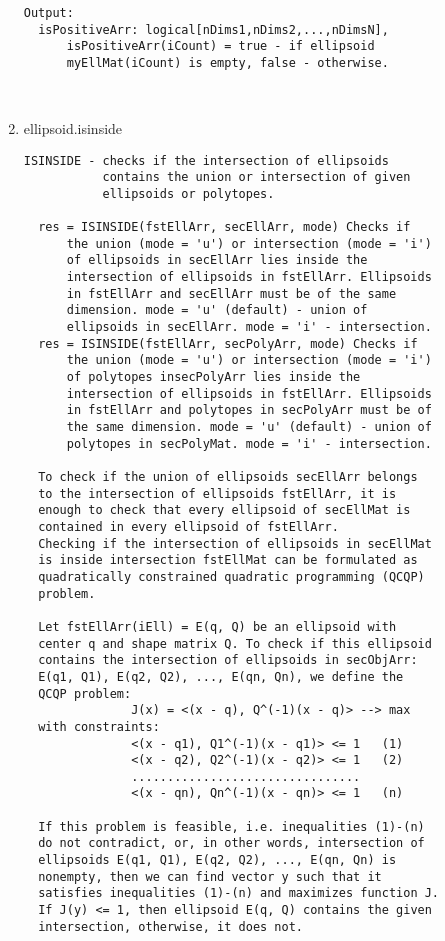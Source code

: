 \begin{enumerate}
\begin{lstlisting}
Output:
  isPositiveArr: logical[nDims1,nDims2,...,nDimsN],
      isPositiveArr(iCount) = true - if ellipsoid
      myEllMat(iCount) is empty, false - otherwise.



\end{lstlisting}
\fontfamily{\familydefault}
\selectfont
\item {ellipsoid.isinside}
\selectfont
\begin{lstlisting}
ISINSIDE - checks if the intersection of ellipsoids
           contains the union or intersection of given
           ellipsoids or polytopes.

  res = ISINSIDE(fstEllArr, secEllArr, mode) Checks if
      the union (mode = 'u') or intersection (mode = 'i')
      of ellipsoids in secEllArr lies inside the
      intersection of ellipsoids in fstEllArr. Ellipsoids
      in fstEllArr and secEllArr must be of the same
      dimension. mode = 'u' (default) - union of
      ellipsoids in secEllArr. mode = 'i' - intersection.
  res = ISINSIDE(fstEllArr, secPolyArr, mode) Checks if
      the union (mode = 'u') or intersection (mode = 'i')
      of polytopes insecPolyArr lies inside the
      intersection of ellipsoids in fstEllArr. Ellipsoids
      in fstEllArr and polytopes in secPolyArr must be of
      the same dimension. mode = 'u' (default) - union of
      polytopes in secPolyMat. mode = 'i' - intersection.

  To check if the union of ellipsoids secEllArr belongs
  to the intersection of ellipsoids fstEllArr, it is
  enough to check that every ellipsoid of secEllMat is
  contained in every ellipsoid of fstEllArr.
  Checking if the intersection of ellipsoids in secEllMat
  is inside intersection fstEllMat can be formulated as
  quadratically constrained quadratic programming (QCQP)
  problem.

  Let fstEllArr(iEll) = E(q, Q) be an ellipsoid with
  center q and shape matrix Q. To check if this ellipsoid
  contains the intersection of ellipsoids in secObjArr:
  E(q1, Q1), E(q2, Q2), ..., E(qn, Qn), we define the
  QCQP problem:
               J(x) = <(x - q), Q^(-1)(x - q)> --> max
  with constraints:
               <(x - q1), Q1^(-1)(x - q1)> <= 1   (1)
               <(x - q2), Q2^(-1)(x - q2)> <= 1   (2)
               ................................
               <(x - qn), Qn^(-1)(x - qn)> <= 1   (n)

  If this problem is feasible, i.e. inequalities (1)-(n)
  do not contradict, or, in other words, intersection of
  ellipsoids E(q1, Q1), E(q2, Q2), ..., E(qn, Qn) is
  nonempty, then we can find vector y such that it
  satisfies inequalities (1)-(n) and maximizes function J.
  If J(y) <= 1, then ellipsoid E(q, Q) contains the given
  intersection, otherwise, it does not.


\end{lstlisting}
\end{enumerate}
